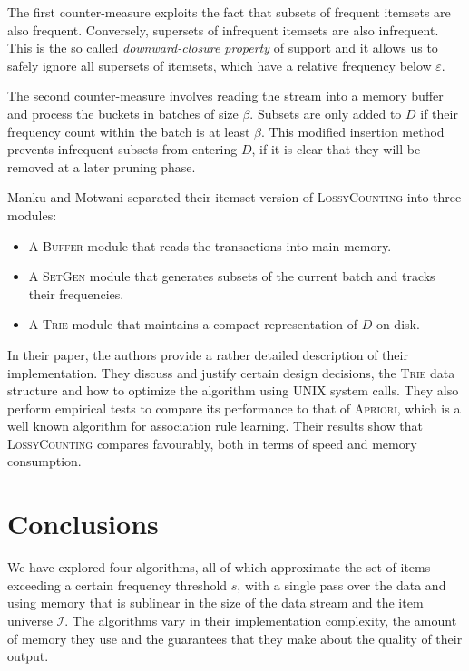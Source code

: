 \documentclass[landscape,twocolumn,a4paper]{article}
\begin{document}
The first counter-measure exploits the fact that subsets of frequent itemsets are also frequent. Conversely, supersets of infrequent itemsets are also infrequent. This is the so called \textit{downward-closure property} of support and it allows us to safely ignore all supersets of itemsets, which have a relative frequency below $\varepsilon$.

The second counter-measure involves reading the stream into a memory buffer and process the buckets in batches of size $\beta$. Subsets are only added to $D$ if their frequency count within the batch is at least $\beta$. This modified insertion method prevents infrequent subsets from entering $D$, if it is clear that they will be removed at a later pruning phase.

Manku and Motwani separated their itemset version of \textsc{LossyCounting} into three modules:
\begin{itemize}
\item A \textsc{Buffer} module that reads the transactions into main memory.
\item A \textsc{SetGen} module that generates subsets of the current batch and tracks their frequencies.
\item A \textsc{Trie} module that maintains a compact representation of $D$ on disk.
\end{itemize}

In their paper, the authors provide a rather detailed description of their implementation. They discuss and justify certain design decisions, the \textsc{Trie} data structure and how to optimize the algorithm using UNIX system calls. They also perform empirical tests to compare its performance to that of \textsc{Apriori}, which is a well known algorithm for association rule learning. Their results show that \textsc{LossyCounting} compares favourably, both in terms of speed and memory consumption.

\section{Conclusions}
We have explored four algorithms, all of which approximate the set of items exceeding a certain frequency threshold $s$, with a single pass over the data and  using memory that is sublinear in the size of the data stream and the item universe $\mathcal{I}$. The algorithms vary in their implementation complexity, the amount of memory they use and the guarantees that they make about the quality of their output. 
\end{document}
